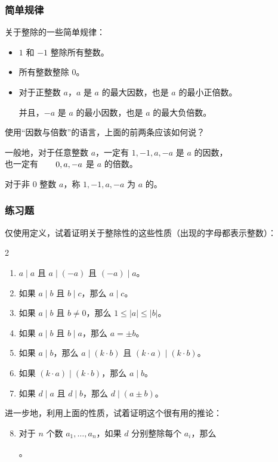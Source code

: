 \begin{frame}
  \frametitle{简单规律}
  关于整除的一些简单规律：
  \pause
  \begin{itemize}
    \item $1$ 和 $-1$ 整除所有整数。
    \pause
    \item 所有整数整除 $0$。
    \pause
    \item 对于\alert{正}整数 $a$，$a$ 是 $a$ 的最大因数，也是 $a$ 的最小\alert{正}倍数。
    
    并且，$-a$ 是 $a$ 的最小因数，也是 $a$ 的最大负倍数。
  \end{itemize}
  \pause
  使用“因数与倍数”的语言，上面的前两条应该如何说？
  \pause
  
  \emptyline
  一般地，对于任意整数 $a$，一定有 $1, -1, a, -a$ 是 $a$ 的因数，\\
  \-\hspace{10em}\hphantom{ $a$}也一定有 $\hphantom{0, -{}}0, a, -a$ 是 $a$ 的倍数。
  
  对于非 $0$ 整数 $a$，称 $1, -1, a, -a$ 为 $a$ 的。
\end{frame}
\begin{frame}
  \frametitle{练习题}
  仅使用定义，试着证明关于整除性的这些性质（出现的字母都表示整数）：
  \pause
  \begin{mymulticols}[l][l]{2}
    \begin{enumerate}
      \item $a \mid a$ 且 $a \mid (-a)$ 且 $(-a) \mid a$。
      \pause
      \item 如果 $a \mid b$ 且 $b \mid c$，那么 $a \mid c$。
    \end{enumerate}
  \end{mymulticols}
  \pause
  \begin{enumerate}
    \setcounter{enumi}{2}
    \item 如果 $a \mid b$ 且 $b \ne 0$，那么 $1 \le \lvert a \rvert \le \lvert b \rvert$。
    \pause
    \item 如果 $a \mid b$ 且 $b \mid a$，那么 $a = \pm b$。
    \pause
    \item 如果 $a \mid b$，那么 $a \mid (k \cdot b)$ 且 $(k \cdot a) \mid (k \cdot b)$。
    \pause
    \item 如果 $(k \cdot a) \mid (k \cdot b)$，那么 $a \mid b$。
    \pause
    \item 如果 $d \mid a$ 且 $d \mid b$，那么 $d \mid (a \pm b)$。
  \end{enumerate}
  \pause
  进一步地，利用上面的性质，试着证明这个很有用的推论：
  \pause
  \begin{enumerate}
    \setcounter{enumi}{7}
    \item 对于 $n$ 个数 $a_1, \ldots, a_n$，如果 $d$ 分别整除每个 $a_i$，那么
    \begin{center}
      。
    \end{center}
  \end{enumerate}
\end{frame}

